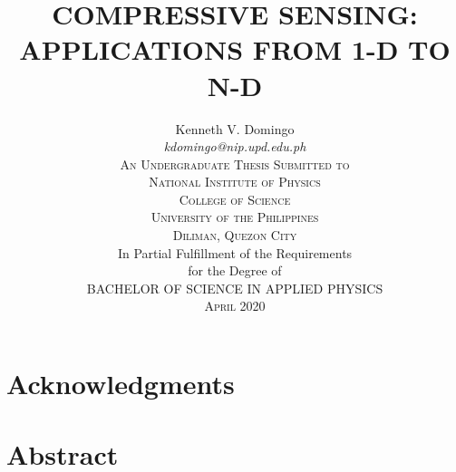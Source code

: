 \documentclass[12pt,oneside]{report}
\begin{document}

\title{
	\Large\uppercase\expandafter{Compressive sensing: Applications from 1-D to N-D
	}
}

\author{
	\large\rm\expandafter{
	Kenneth V. Domingo 
	}\\
	\large\textit{\expandafter{
		kdomingo@nip.upd.edu.ph
	}}\\
	\textsc{An Undergraduate Thesis Submitted to}\\
	\textsc{National Institute of Physics}\\
	\textsc{College of Science}\\
	\textsc{University of the Philippines} \\
	\textsc{Diliman, Quezon City}\\
	\vskip0.25in
	\rm In Partial Fulfillment of the Requirements\\
	\rm for the Degree of\\
	\rm\uppercase\expandafter{Bachelor of Science}
	\rm\uppercase{in}
	\rm\uppercase\expandafter{Applied Physics}\\
	\textsc\expandafter{April 2020}
}

\maketitle
\thispagestyle{titlestyle}

\chapter*{Acknowledgments}

\chapter*{Abstract}

\tableofcontents
\listoffigures
\listoftables

\cleardoublepage
{}

\listofchanges








\appendix




\end{document}
